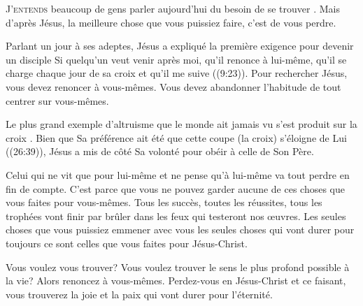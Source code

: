 \lettrine{J}{'entends} beaucoup de gens parler aujourd'hui du besoin
 de \Og se trouver \Fg{}. Mais d'après Jésus, la meilleure chose
 que vous puissiez faire, c'est de vous perdre. 

Parlant un jour à ses adeptes, Jésus a expliqué la première exigence
 pour devenir un disciple\frcolon{} \Og Si quelqu'un veut venir après moi,
 qu'il renonce à lui-même, qu'il se charge chaque jour de sa croix
 et qu'il me suive \Fg{} ((9:23)).
 Pour rechercher Jésus, vous devez renoncer à vous-mêmes.
 Vous devez abandonner l'habitude de tout centrer sur vous-mêmes. 

Le plus grand exemple d'altruisme que le monde ait jamais vu
 s'est produit sur la croix . Bien que Sa préférence ait été
 que cette coupe (la croix) s'éloigne de Lui ((26:39)),
 Jésus a mis de côté Sa volonté pour obéir à celle de Son Père. 


Celui qui ne vit que pour lui-même et ne pense qu'à lui-même va tout perdre
 en fin de compte. C'est parce que vous ne pouvez garder aucune
 de ces choses que vous faites pour vous-mêmes. Tous les succès,
 toutes les réussites, tous les trophées vont finir par brûler
 dans les feux qui testeront nos \oe{}uvres. Les seules choses
 que vous puissiez emmener avec vous \ocadr les seules choses
 qui vont durer pour toujours \fcadr{} ce sont celles
 que vous faites pour Jésus-Christ. 

Vous voulez vous trouver? Vous voulez trouver le sens le plus profond
 possible à la vie? Alors renoncez à vous-mêmes. Perdez-vous
 en Jésus-Christ et ce faisant, vous trouverez la joie et la paix
 qui vont durer pour l'éternité. 

\dvrule






